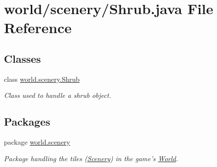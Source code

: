 \hypertarget{a00072}{\section{world/scenery/\-Shrub.java File Reference}
\label{a00072}
}
\subsection*{Classes}
\begin{DoxyCompactItemize}
\item 
class \hyperlink{a00026}{world.\-scenery.\-Shrub}
\begin{DoxyCompactList}\small\item\em Class used to handle a shrub object. \end{DoxyCompactList}\end{DoxyCompactItemize}
\subsection*{Packages}
\begin{DoxyCompactItemize}
\item 
package \hyperlink{a00091}{world.\-scenery}
\begin{DoxyCompactList}\small\item\em Package handling the tiles (\hyperlink{a00024}{Scenery}) in the game's \hyperlink{a00039}{World}. \end{DoxyCompactList}\end{DoxyCompactItemize}
